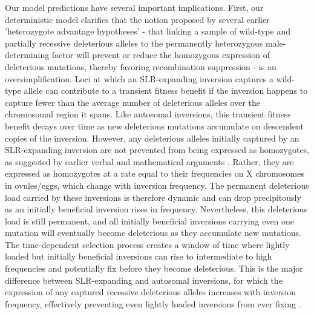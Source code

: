 \documentclass[11pt]{article}
\begin{document}
Our model predictions have several important implications. First, our deterministic model clarifies that the notion proposed by several earlier 'heterozygote advantage hypotheses' - that linking a sample of wild-type and partially recessive deleterious alleles to the permanently heterozygous male-determining factor will prevent or reduce the homozygous expression of deleterious mutations, thereby favoring recombination suppression - is an oversimplification. Loci at which an SLR-expanding inversion captures a wild-type allele can contribute to a transient fitness benefit if the inversion happens to capture fewer than the average number of deleterious alleles over the chromosomal region it spans. Like autosomal inversions, this transient fitness benefit decays over time as new deleterious mutations accumulate on descendent copies of the inversion. However, any deleterious alleles initially captured by an SLR-expanding inversion are not prevented from being expressed as homozygotes, as suggested by earlier verbal and mathematical arguments \citep{Ironside2010, Jay2021}. Rather, they are expressed as homozygotes at a rate equal to their frequencies on X chromosomes in ovules/eggs, which change with inversion frequency. The permanent deleterious load carried by these inversions is therefore dynamic and can drop precipitously as an initially beneficial inversion rises in frequency. Nevertheless, this deleterious load is still permanent, and all initially beneficial inversions carrying even one mutation will eventually become deleterious as they accumulate new mutations. The time-dependent selection process creates a window of time where lightly loaded but initially beneficial inversions can rise to intermediate to high frequencies and potentially fix before they become deleterious. This is the major difference between SLR-expanding and autosomal inversions, for which the expression of any captured recessive deleterious alleles increases with inversion frequency, effectively preventing even lightly loaded inversions from ever fixing \citep{Nei1967,ConnallonOlito2020}. 
\end{document}
